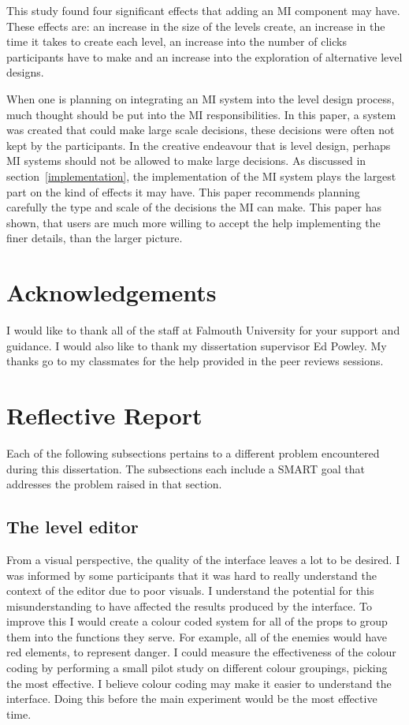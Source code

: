 \documentclass[journal]{IEEEtran}
\begin{document}
This study found four significant effects that adding an MI component may have. These effects are: an increase in the size of the levels create, an increase in the time it takes to create each level, an increase into the number of clicks participants have to make and an increase into the exploration of alternative level designs. 

When one is planning on integrating an MI system into the level design process, much thought should be put into the MI responsibilities. In this paper, a system was created that could make large scale decisions, these decisions were often not kept by the participants. In the creative endeavour that is level design, perhaps MI systems should not be allowed to make large decisions. As discussed in section~\ref{implementation}, the implementation of the MI system plays the largest part on the kind of effects it may have. This paper recommends planning carefully the type and scale of the decisions the MI can make. This paper has shown, that users are much more willing to accept the help implementing the finer details, than the larger picture.




\appendices
\section{Acknowledgements}
I would like to thank all of the staff at Falmouth University for your support and guidance. I would also like to thank my dissertation supervisor Ed Powley. My thanks go to my classmates for the help provided in the peer reviews sessions.

\section{Reflective Report}
Each of the following subsections pertains to a different problem encountered during this dissertation. The subsections each include a SMART goal that addresses the problem raised in that section.

\subsection{The level editor}
From a visual perspective, the quality of the interface leaves a lot to be desired. I was informed by some participants that it was hard to really understand the context of the editor due to poor visuals. I understand the potential for this misunderstanding to have affected the results produced by the interface. To improve this I would create a colour coded system for all of the props to group them into the functions they serve. For example, all of the enemies would have red elements, to represent danger. I could measure the effectiveness of the colour coding by performing a small pilot study on different colour groupings, picking the most effective. I believe colour coding may make it easier to understand the interface. Doing this before the main experiment would be the most effective time. 
\end{document}
